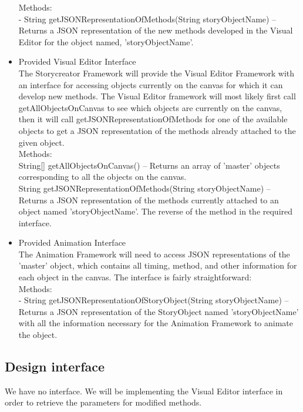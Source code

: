 \documentclass[12pt]{article}
\begin{document}
\begin{itemize}
	Methods: \\
	\indent - String getJSONRepresentationOfMethods(String storyObjectName) -- Returns a JSON representation of the new methods developed in the Visual Editor for the object named, 'storyObjectName'. \\
	
	\item Provided Visual Editor Interface \\
	The Storycreator Framework will provide the Visual Editor Framework with an interface for accessing objects currently on the canvas for which it can develop new methods. The Visual Editor framework will most likely first call getAllObjectsOnCanvas to see which objects are currently on the canvas, then it will call getJSONRepresentationOfMethods for one of the available objects to get a JSON representation of the methods already attached to the given object.  \\
	
	Methods: \\
	\indent String[] getAllObjectsOnCanvas() -- Returns an array of 'master' objects corresponding to all the objects on the canvas. \\
	
	\indent 	 String getJSONRepresentationOfMethods(String storyObjectName) -- Returns a JSON representation of the methods currently attached to an object named 'storyObjectName'. The reverse of the method in the required interface. \\
	
	\item Provided Animation Interface \\
	The Animation Framework will need to access JSON representations of the 'master' object, which contains all timing, method, and other information for each object in the canvas. The interface is fairly straightforward: \\
	
	Methods: \\
	\indent - String getJSONRepresentationOfStoryObject(String storyObjectName) -- Returns a JSON representation of the StoryObject named 'storyObjectName' with all the information necessary for the Animation Framework to animate the object. \\
	
\end{itemize}

\subsection{Design interface}
We have no interface.  We will be implementing the Visual Editor interface in order to retrieve the parameters for modified methods.
\end{document}
